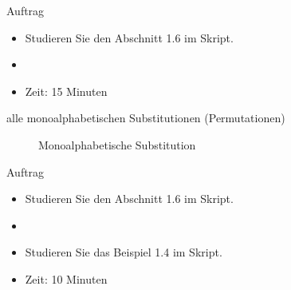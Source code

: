 \begin{frame}{Auftrag}
    \begin{itemize}
        \item Studieren Sie den Abschnitt 1.6 im Skript.
        \item {}
        \item Zeit: 15 Minuten
    \end{itemize}
\end{frame}


\begin{frame}{alle monoalphabetischen Substitutionen (Permutationen)}
\begin{figure}[H]
	\centering
	\caption{Monoalphabetische Substitution}
	\label{fig:monoalph-subst}
\end{figure}
\end{frame}


\begin{frame}{Auftrag}
    \begin{itemize}
        \item Studieren Sie den Abschnitt 1.6 im Skript.
        \item {}
        \item Studieren Sie das Beispiel 1.4 im Skript.
        \item Zeit: 10 Minuten
    \end{itemize}
\end{frame}



